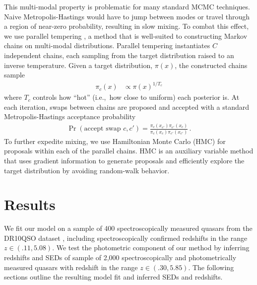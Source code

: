 \documentclass{article}
\begin{document}
This multi-modal property is problematic for many standard MCMC techniques. 
Naive Metropolis-Hastings would have to jump between modes or travel through a region of near-zero probability, resulting in slow mixing.  
To combat this effect, we use parallel tempering \cite{brooks2011handbook}, a method that is well-suited to constructing Markov chains on multi-modal distributions.
Parallel tempering instantiates $C$ independent chains, each sampling from the target distribution raised to an inverse temperature.
Given a target distribution, $\pi(x)$, the constructed chains sample 
\begin{align}
  \pi_c(x) &\propto \pi(x)^{1/T_c}
\end{align}
where $T_c$ controls how ``hot'' (i.e.,~how close to uniform) each posterior is. 
At each iteration, swaps between chains are proposed and accepted with a standard Metropolis-Hastings acceptance probability 
\begin{align}
  \Pr(\text{accept swap } c, c') = \frac{ \pi_c(x_{c'}) \pi_{c'}(x_c) }{ \pi_c(x_c) \pi_{c'}(x_{c'}) } \, .
\end{align}
To further expedite mixing, we use Hamiltonian Monte Carlo (HMC) \cite{neal2011mcmc} for proposals within each of the parallel chains.
HMC is an auxiliary variable method that uses gradient information to generate proposals and efficiently explore the target distribution by avoiding random-walk behavior.

\section{Results}
\label{sec:experiments}
We fit our model on a sample of 400 spectroscopically measured quasars from the DR10QSO dataset \cite{paris2014sloan}, including spectroscopically confirmed redshifts in the range ${z \in (.11,  5.08)}$.  
We test the photometric component of our method by inferring redshifts and SEDs of sample of 2,000 spectroscopically and photometrically measured quasars with redshift in the range ${z \in (.30, 5.85)}$.  
The following sections outline the resulting model fit and inferred SEDs and redshifts. 
\end{document}
